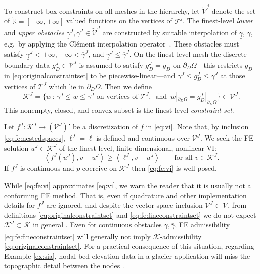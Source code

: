 \documentclass[review,hidelinks,onefignum,onetabnum,final]{siamart220329}  %
\newcommand{\RR}{\mathbb{R}}
\newcommand{\cK}{\mathcal{K}}
\newcommand{\ip}[2]{\left<#1,#2\right>}
\begin{document}
To construct box constraints on all meshes in the hierarchy, let $\tilde{\mathcal{V}}^j$ denote the set of $\tilde{\RR} = [-\infty,+\infty]$ valued functions on the vertices of $\mathcal{T}^j$.  The finest-level \emph{lower} and \emph{upper obstacles} $\underline{\gamma}^J, \overline{\gamma}^J \in \tilde{\mathcal{V}}^J$ are constructed by suitable interpolation of $\underline{\gamma}$, $\overline{\gamma}$, e.g.~by applying the Cl\'ement interpolation operator~\cite{Carstensen2006}.  These obstacles must satisfy $\underline{\gamma}^J < +\infty$, $-\infty < \overline{\gamma}^J$, and $\underline{\gamma}^J \le \overline{\gamma}^J$.  On the finest-level mesh the discrete boundary data $g_D^J \in \mathcal{V}^J$ is assumed to satisfy $g_D^J = g_D$ on $\partial_D \Omega$---this restricts $g_D$ in \eqref{eq:originalconstraintset} to be piecewise-linear---and $\underline{\gamma}^J \le g_D^J \le \overline{\gamma}^J$ at those vertices of $\mathcal{T}^J$ which lie in $\partial_D \Omega$.  Then we define
\begin{equation}
\mathcal{K}^J = \big\{w\,:\,\underline{\gamma}^J \le w \le \overline{\gamma}^J \text{ on vertices of } \mathcal{T}^J, \, \text{ and } \, w|_{\partial_D\Omega} = g_D^J|_{\partial_D\Omega}\big\} \subset \mathcal{V}^J. \label{eq:fe:fineconstraintset}
\end{equation}
This nonempty, closed, and convex subset is the finest-level \emph{constraint set}.

Let $f^J:\mathcal{K}^J \to (\mathcal{V}^J)'$ be a discretization of $f$ in \eqref{eq:vi}.  Note that, by inclusion \eqref{eq:fe:nestedspaces}, $\ell^J=\ell$ is defined and continuous over $\mathcal{V}^J$.  We seek the FE solution $u^J \in \mathcal{K}^J$ of the finest-level, finite-dimensional, nonlinear VI:
\begin{equation}
\ip{f^J(u^J)}{v-u^J} \ge \ip{\ell^J}{v-u^J} \qquad \text{for all } v\in \cK^J. \label{eq:fe:vi}
\end{equation}
If $f^J$ is continuous and $p$-coercive on $\mathcal{K}^J$ then \eqref{eq:fe:vi} is well-posed.

While \eqref{eq:fe:vi} approximates \eqref{eq:vi}, we warn the reader that it is usually not a conforming FE method.  That is, even if quadrature and other implementation details for $f^J$ are ignored, and despite the vector space inclusion $\mathcal{V}^J \subset \mathcal{V}$, from definitions \eqref{eq:originalconstraintset} and \eqref{eq:fe:fineconstraintset} we do not expect $\mathcal{K}^J \subset \mathcal{K}$ in general \cite[section 5.1]{Ciarlet2002}.  Even for continuous obstacles $\underline{\gamma}, \overline{\gamma}$, FE admissibility \eqref{eq:fe:fineconstraintset} will generally not imply $\mathcal{K}$-admissibility \eqref{eq:originalconstraintset}.  For a practical consequence of this situation, regarding Example \ref{ex:sia}, nodal bed elevation data in a glacier application will miss the topographic detail between the nodes \cite{Bueler2016}.
\end{document}
